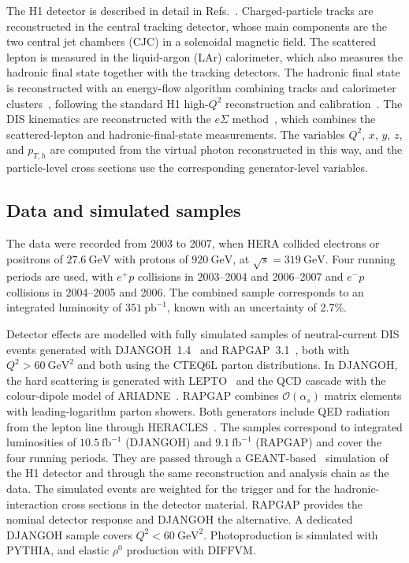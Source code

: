 \documentclass[11pt,a4paper]{article}
\newcommand{\Qsq}{Q^{2}}
\newcommand{\pTh}{p_{T,h}}
\newcommand{\GeV}{\mathrm{GeV}}
\newcommand{\GeVsq}{\mathrm{GeV}^{2}}
\newcommand{\pbinv}{\mathrm{pb}^{-1}}
\begin{document}
The H1 detector is described in detail in Refs.~\cite{H1:1996jzy,H1:1996cvd}. Charged-particle tracks are reconstructed in the central tracking detector, whose main components are the two central jet chambers (CJC) in a solenoidal magnetic field. The scattered lepton is measured in the liquid-argon (LAr) calorimeter, which also measures the hadronic final state together with the tracking detectors. The hadronic final state is reconstructed with an energy-flow algorithm combining tracks and calorimeter clusters~\cite{Peez:2005Hadroo2}, following the standard H1 high-$\Qsq$ reconstruction and calibration~\cite{Kogler:2011zz,Britzger:2013}. The DIS kinematics are reconstructed with the $e\Sigma$ method~\cite{Bassler:1994uq,Bassler:1997tv}, which combines the scattered-lepton and hadronic-final-state measurements. The variables $\Qsq$, $x$, $y$, $z$, and $\pTh$ are computed from the virtual photon reconstructed in this way, and the particle-level cross sections use the corresponding generator-level variables.

\subsection{Data and simulated samples}

The data were recorded from 2003 to 2007, when HERA collided electrons or positrons of $27.6~\GeV$ with protons of $920~\GeV$, at $\sqrt{s}=319~\GeV$. Four running periods are used, with $e^{+}p$ collisions in 2003--2004 and 2006--2007 and $e^{-}p$ collisions in 2004--2005 and 2006. The combined sample corresponds to an integrated luminosity of $351~\pbinv$, known with an uncertainty of 2.7\%.

Detector effects are modelled with fully simulated samples of neutral-current DIS events generated with DJANGOH~1.4~\cite{Charchula:1994kf} and RAPGAP~3.1~\cite{Jung:1993gf}, both with $\Qsq>60~\GeVsq$ and both using the CTEQ6L parton distributions. In DJANGOH, the hard scattering is generated with LEPTO~\cite{Ingelman:1996mq} and the QCD cascade with the colour-dipole model of ARIADNE~\cite{Lonnblad:1992tz}. RAPGAP combines $\mathcal{O}(\alpha_{s})$ matrix elements with leading-logarithm parton showers. Both generators include QED radiation from the lepton line through HERACLES~\cite{Kwiatkowski:1990es}. The samples correspond to integrated luminosities of $10.5~\mathrm{fb}^{-1}$ (DJANGOH) and $9.1~\mathrm{fb}^{-1}$ (RAPGAP) and cover the four running periods. They are passed through a GEANT-based~\cite{Brun:1987ma} simulation of the H1 detector and through the same reconstruction and analysis chain as the data. The simulated events are weighted for the trigger and for the hadronic-interaction cross sections in the detector material. RAPGAP provides the nominal detector response and DJANGOH the alternative. A dedicated DJANGOH sample covers $\Qsq<60~\GeVsq$. Photoproduction is simulated with PYTHIA, and elastic $\rho^{0}$ production with DIFFVM.
\end{document}
